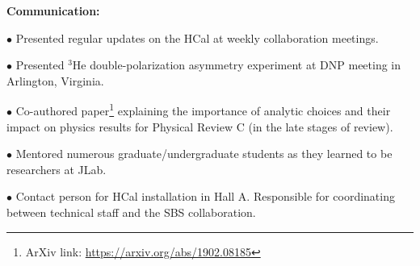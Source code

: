 \documentclass[letterpaper,10pt]{article}
\renewenvironment{itemize}{
  \begin{list}{}{
    \setlength{\leftmargin}{1.5em}
  }
}{
  \end{list}
}
\begin{document}
{\begin{itemize}
\begin{itemize}
		\item \textbf{Communication:}
			\begin{itemize}\itemsep5pt
				\item $\bullet$ Presented regular updates on the HCal at weekly collaboration meetings.
				\item $\bullet$ Presented $^3$He double-polarization asymmetry experiment at DNP meeting in Arlington, Virginia.
				\item $\bullet$ Co-authored paper\footnote{ArXiv link: \url{https://arxiv.org/abs/1902.08185}} explaining the importance of analytic choices and their impact on physics results for Physical Review C (in the late stages of review).
				\item $\bullet$ Mentored numerous graduate/undergraduate students as they learned to be researchers at JLab.
				\item $\bullet$ Contact person for HCal installation in Hall A. Responsible for coordinating between technical staff and the SBS collaboration.
			\end{itemize}
			
	\end{itemize}


\end{itemize}}
\end{document}

